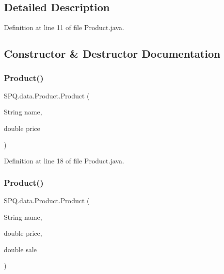 \subsection{Detailed Description}


Definition at line 11 of file Product.\+java.



\subsection{Constructor \& Destructor Documentation}
\mbox{\label{class_s_p_q_1_1data_1_1_product_ac5b9fd5a8d446b4d5354f4d35fbd0384}} 
\subsubsection{\texorpdfstring{Product()}{Product()}\hspace{0.1cm}{\footnotesize\ttfamily [1/3]}}
{\footnotesize\ttfamily S\+P\+Q.\+data.\+Product.\+Product (\begin{DoxyParamCaption}\item[{String}]{name,  }\item[{double}]{price }\end{DoxyParamCaption})}



Definition at line 18 of file Product.\+java.

\mbox{\label{class_s_p_q_1_1data_1_1_product_aeb77e341c092434872d42248d1c3af7d}} 
\subsubsection{\texorpdfstring{Product()}{Product()}\hspace{0.1cm}{\footnotesize\ttfamily [2/3]}}
{\footnotesize\ttfamily S\+P\+Q.\+data.\+Product.\+Product (\begin{DoxyParamCaption}\item[{String}]{name,  }\item[{double}]{price,  }\item[{double}]{sale }\end{DoxyParamCaption})}



